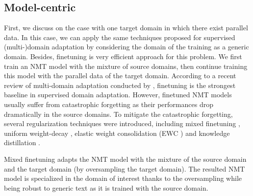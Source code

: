 \subsection{Model-centric}
First, we discuss on the case with one target domain in which there exist parallel data. In this case, we can apply the same techniques proposed for supervised (multi-)domain adaptation by considering the domain of the training as a generic domain. Besides, finetuning is very efficient approach for this problem\citep{Luong15stanford,Miceli17regularization,Servan16Domain,Freitag16fast}. We first train an NMT model with the mixture of source domains, then continue training this model with the parallel data of the target domain. According to a recent review of multi-domain adaptation conducted by \citet{Pham20Priming}, finetuning is the strongest baseline in supervised domain adaptation. However, finetuned NMT models usually suffer from catastrophic forgetting \citep{Michael89catastrophic} as their performances drop dramatically in the source domains. To mitigate the catastrophic forgetting, several regularization techniques were introduced, including mixed finetuning \citep{Chu17empirical}, uniform weight-decay \citep{Miceli17regularization}, elastic weight consolidation (EWC ) \citep{Brian19overcoming, Kirk16overcoming, Saunders19domain} and knowledge distillation \citep{Dakwle17fine}. 

Mixed finetuning \citep{Chu17empirical} adapts the NMT model with the mixture of the source domain and the target domain (by oversampling the target domain). The resulted NMT model is specialized in the domain of interest thanks to the oversampling while being robust to generic text as it is trained with the source domain.

